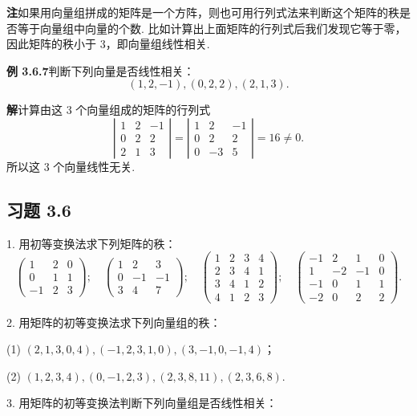 \documentclass[UTF8, 12pt, fontset=fandol, oneside]{ctexart}
\begin{document}
\noindent\textbf{注}\quad 如果用向量组拼成的矩阵是一个方阵，则也可用行列式法来判断这个矩阵的秩是否等于向量组中向量的个数. 比如计算出上面矩阵的行列式后我们发现它等于零，因此矩阵的秩小于 3，即向量组线性相关.

\noindent\textbf{例 3.6.7}\quad 判断下列向量是否线性相关：
\[
(1,2,-1),(0,2,2),(2,1,3).
\]

\noindent\textbf{解}\quad 计算由这 3 个向量组成的矩阵的行列式
\[
\left|\begin{array}{rrr}
1&2&-1\\
0&2&2\\
2&1&3
\end{array}\right|
=
\left|\begin{array}{rrr}
1&2&-1\\
0&2&2\\
0&-3&5
\end{array}\right|
=16\neq 0.
\]
所以这 3 个向量线性无关.

\subsection*{习题 3.6}

1. 用初等变换法求下列矩阵的秩：
\[
\left(\begin{array}{rrr}
1&2&0\\
0&1&1\\
-1&2&3
\end{array}\right);\quad
\left(\begin{array}{rrr}
1&2&3\\
0&-1&-1\\
3&4&7
\end{array}\right);\quad
\left(\begin{array}{rrrr}
1&2&3&4\\
2&3&4&1\\
3&4&1&2\\
4&1&2&3
\end{array}\right);\quad
\left(\begin{array}{rrrr}
-1&2&1&0\\
1&-2&-1&0\\
-1&0&1&1\\
-2&0&2&2
\end{array}\right).
\]

2. 用矩阵的初等变换法求下列向量组的秩：

(1) $(2,1,3,0,4),(-1,2,3,1,0),(3,-1,0,-1,4)$；

(2) $(1,2,3,4),(0,-1,2,3),(2,3,8,11),(2,3,6,8)$.

3. 用矩阵的初等变换法判断下列向量组是否线性相关：
\end{document}
